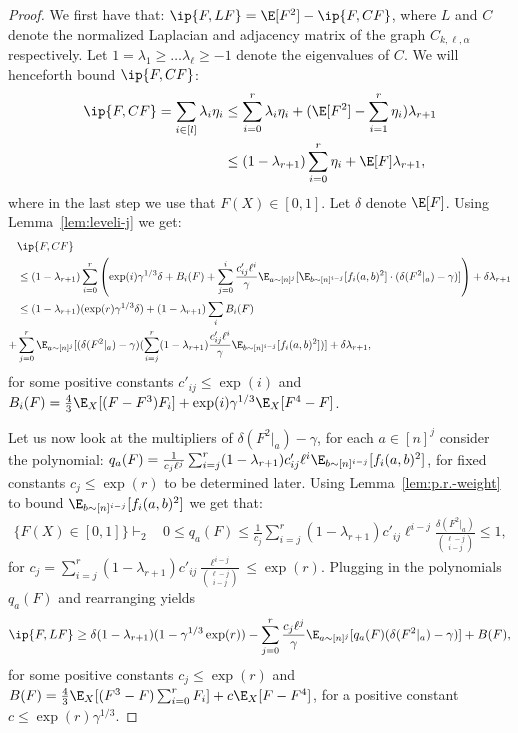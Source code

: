 \begin{proof}
We first have that: $\ip{F, LF} = \E[F^{ 2}]  - \ip{F,CF}$, where $L$ and $C$ denote the normalized Laplacian and adjacency matrix of the graph $C_{k,\ell,\alpha}$ respectively. Let $1=\lambda_1 \geq \ldots \lambda_\ell \geq -1$ denote the eigenvalues of $C$. We will henceforth bound $\ip{F,CF}$:
\begin{align*}
\ip{F,CF} = \sum_{i \in [l]} \lambda_i \eta_i 
&\leq \sum_{i = 0}^r \lambda_i\eta_i + (\E[F^{ 2}] - \sum_{i=1}^r \eta_i)\lambda_{r+1} \\
&\leq (1 - \lambda_{r+1}) \sum_{i=0}^r \eta_i + \E[F]\lambda_{r+1},\\
\end{align*}
where in the last step we use that $F(X) \in [0,1]$. Let $\delta$ denote $\E[F]$. Using Lemma~\ref{lem:leveli-j} we get: 
\begin{align}
&\ip{F,CF} \notag\\
&\leq (1 - \lambda_{r+1})\sum_{i=0}^r \left(\exp(i)\gamma^{1/3}\delta + B_{i}(F)+ \sum_{j = 0}^i  \frac{c'_{ij}\ell^{i}}{\gamma}\E_{a \sim [n]^{j}}[\E_{b \sim [n]^{i-j}}[f_i(a,b)^2]\cdot (\delta(F^{2}|_a) - \gamma)] \right) + \delta\lambda_{r+1} \notag\\
&\leq (1 - \lambda_{r+1})(\exp(r)\gamma^{1/3}\delta) + (1-\lambda_{r+1})\sum_i B_i(F) \notag\\+ &\sum_{j = 0}^r  \E_{a \sim [n]^{j}}[ (\delta(F^{ 2}|_a) - \gamma)(\sum_{i = j}^r (1 - \lambda_{r+1})\frac{c'_{ij} \ell^{i}}{\gamma} \E_{b \sim [n]^{i-j}}[f_i(a,b)^2])] +  \delta\lambda_{r+1}, \notag
\end{align}
for some positive constants $c'_{ij} \leq \exp(i)$ and $B_i(F) =  \frac{4}{3}\E_X[(F - F^{ 3})F_i] + \exp(i)\gamma^{1/3}\E_X[F^{ 4} - F]$.

Let us now look at the multipliers of $\delta(F^{2}|_a) - \gamma$, for each $a \in [n]^j$ consider the polynomial: $q_a(F) = \frac{1}{c_j\ell^j}\sum_{i = j}^r (1 - \lambda_{r+1})c'_{ij} \ell^{i} \E_{b \sim [n]^{i-j}}[f_i(a,b)^2]$, for fixed constants $c_j \leq \exp(r)$ to be determined later. Using Lemma~\ref{lem:p.r.-weight} to bound $\E_{b \sim [n]^{i-j}}[f_i(a,b)^2]$ we get that:
\begin{align*}
\{F(X) \in [0,1]\} \vdash_2 ~~~~0 \leq q_a(F) \leq \frac{1}{c_j}\sum_{i = j}^r (1 - \lambda_{r+1})c'_{ij}\ell^{i-j} \frac{ \delta(F^{2}|_a)}{{\ell - j \choose i - j}} \leq 1,
\end{align*}
for $c_j = \sum_{i = j}^r (1 - \lambda_{r+1})c'_{ij}\frac{\ell^{i-j}}{{\ell - j \choose i-j}} \leq \exp(r)$. Plugging in the polynomials $q_a(F)$ and rearranging yields
\[\ip{F,LF} \geq \delta(1 - \lambda_{r+1})(1- \gamma^{1/3}\exp(r)) - \sum_{j = 0}^r  \frac{c_j\ell^{j}}{\gamma}\E_{a \sim [n]^{j}}[q_a(F)(\delta(F^{ 2}|_a) - \gamma)] + B(F),\]
for some positive constants $c_j \leq \exp(r)$ and $B(F) = \frac{4}{3}\E_X[(F^{ 3} - F)\sum_{i = 0}^r F_i] + c\E_X[F - F^{ 4}]$, for a positive constant $c \leq \exp(r)\gamma^{1/3}$. 


\end{proof}
